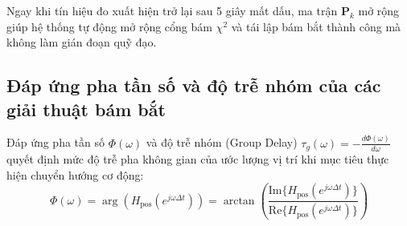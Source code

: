 \begin{table}[H]
\centering
\caption{Sự gia tăng sai số bám bắt trong các kịch bản mất tín hiệu đo lường liên tục}
\label{tab:dead-reckoning-drift-table}
\end{table}

Ngay khi tín hiệu đo xuất hiện trở lại sau 5 giây mất dấu, ma trận $\mathbf{P}_k$ mở rộng giúp hệ thống tự động mở rộng cổng bám $\chi^2$ và tái lập bám bắt thành công mà không làm gián đoạn quỹ đạo.

\subsection{Đáp ứng pha tần số và độ trễ nhóm của các giải thuật bám bắt}

\hspace{0.5cm} Đáp ứng pha tần số $\Phi(\omega)$ và độ trễ nhóm (Group Delay) $\tau_g(\omega) = -\frac{d\Phi(\omega)}{d\omega}$ quyết định mức độ trễ pha không gian của ước lượng vị trí khi mục tiêu thực hiện chuyển hướng cơ động:
\begin{equation}
\Phi(\omega) = \arg\left( H_{\text{pos}}(e^{j\omega \Delta t}) \right) = \arctan\left( \frac{\text{Im}\{H_{\text{pos}}(e^{j\omega \Delta t})\}}{\text{Re}\{H_{\text{pos}}(e^{j\omega \Delta t})\}} \right)
\label{eq:phase-response-formula}
\end{equation}

